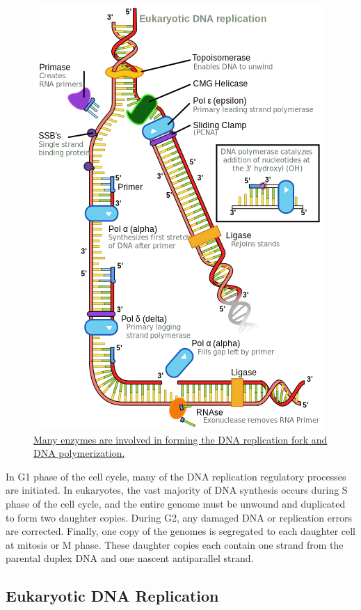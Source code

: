 \begin{figure}

{\centering \includegraphics[width=0.7\linewidth]{./figures/replication/Eukaryotic_DNA_replication} 

}

\caption{\href{https://commons.wikimedia.org/wiki/File:Eukaryotic_DNA_replication.svg}{Many enzymes are involved in forming the DNA replication fork and DNA polymerization.}}\label{fig:repforkform}
\end{figure}

In G1 phase of the cell cycle, many of the DNA replication regulatory processes are initiated. In eukaryotes, the vast majority of DNA synthesis occurs during S phase of the cell cycle, and the entire genome must be unwound and duplicated to form two daughter copies. During G2, any damaged DNA or replication errors are corrected. Finally, one copy of the genomes is segregated to each daughter cell at mitosis or M phase. These daughter copies each contain one strand from the parental duplex DNA and one nascent antiparallel strand.

\hypertarget{eukaryotic-dna-replication}{%
\subsection{Eukaryotic DNA Replication}\label{eukaryotic-dna-replication}}

